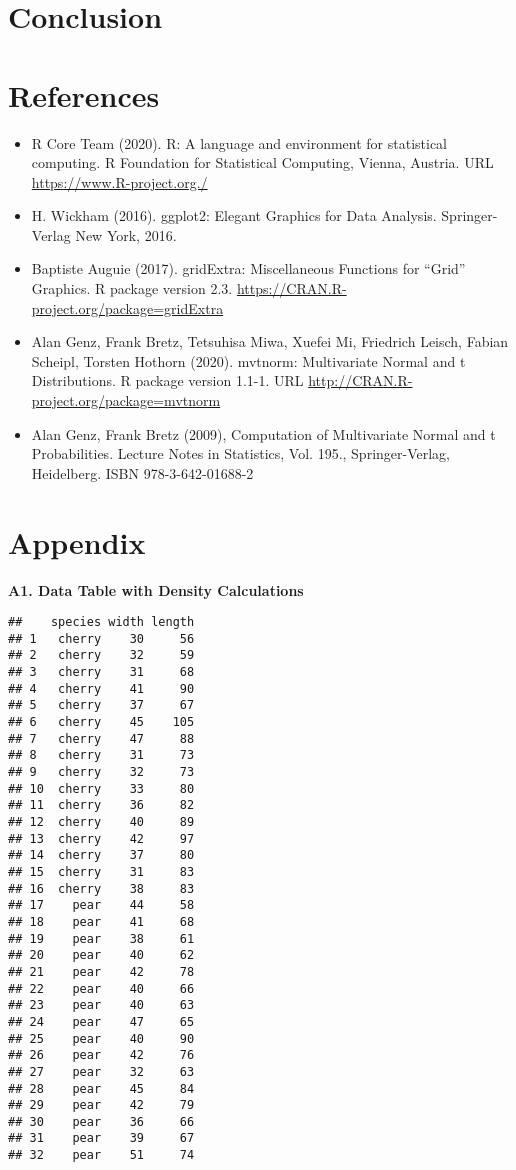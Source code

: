 \documentclass[]{article}
\begin{document}
\newpage

\section{Conclusion}

\newpage

\section{References}

\begin{itemize}
\item
  R Core Team (2020). R: A language and environment for statistical
  computing. R Foundation for Statistical Computing, Vienna, Austria.
  URL \url{https://www.R-project.org./}
\item
  H. Wickham (2016). ggplot2: Elegant Graphics for Data Analysis.
  Springer-Verlag New York, 2016.
\item
  Baptiste Auguie (2017). gridExtra: Miscellaneous Functions for
  ``Grid'' Graphics. R package version 2.3.
  \url{https://CRAN.R-project.org/package=gridExtra}
\item
  Alan Genz, Frank Bretz, Tetsuhisa Miwa, Xuefei Mi, Friedrich Leisch,
  Fabian Scheipl, Torsten Hothorn (2020). mvtnorm: Multivariate Normal
  and t Distributions. R package version 1.1-1. URL
  \url{http://CRAN.R-project.org/package=mvtnorm}
\item
  Alan Genz, Frank Bretz (2009), Computation of Multivariate Normal and
  t Probabilities. Lecture Notes in Statistics, Vol. 195.,
  Springer-Verlag, Heidelberg. ISBN 978-3-642-01688-2
\end{itemize}

\newpage

\section{Appendix}

\textbf{A1. Data Table with Density Calculations}

\begin{verbatim}
##    species width length
## 1   cherry    30     56
## 2   cherry    32     59
## 3   cherry    31     68
## 4   cherry    41     90
## 5   cherry    37     67
## 6   cherry    45    105
## 7   cherry    47     88
## 8   cherry    31     73
## 9   cherry    32     73
## 10  cherry    33     80
## 11  cherry    36     82
## 12  cherry    40     89
## 13  cherry    42     97
## 14  cherry    37     80
## 15  cherry    31     83
## 16  cherry    38     83
## 17    pear    44     58
## 18    pear    41     68
## 19    pear    38     61
## 20    pear    40     62
## 21    pear    42     78
## 22    pear    40     66
## 23    pear    40     63
## 24    pear    47     65
## 25    pear    40     90
## 26    pear    42     76
## 27    pear    32     63
## 28    pear    45     84
## 29    pear    42     79
## 30    pear    36     66
## 31    pear    39     67
## 32    pear    51     74
\end{verbatim}
\end{document}
